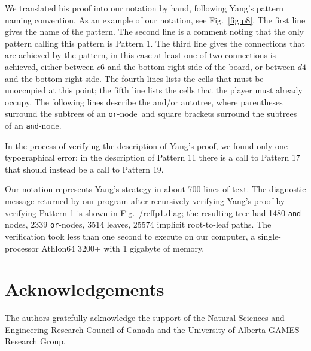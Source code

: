 \documentclass{llncs}
\def\aoat{and/or autotree}
\def\myAND{\mbox{\tt and}}
\def\myOR{\mbox{\tt or}}
\def\andnode{\myAND-node}
\def\ornode{\myOR-node}
\begin{document}


We translated his proof into our notation by hand,
following Yang's pattern naming convention.
As an example of our notation, see Fig.~\ref{fig:p8}.
The first line gives the name of the pattern.
The second line is a comment 
noting that the only pattern calling this pattern is Pattern 1.
The third line
gives the connections that are achieved by the pattern,
in this case at least one of two connections is achieved,
either between $c6$ and the bottom right side of the board,
or between $d4$ and the bottom right side.
The fourth lines lists the cells that must 
be unoccupied at this point;
the fifth line lists the cells that the player must
already occupy.
The following lines describe the \aoat,
where parentheses surround the subtrees of an \ornode\
and square brackets surround the subtrees of an \andnode.

In the process of verifying the description of Yang's proof,
we found only one typographical error:
in the description of Pattern 11 there is a call
to Pattern 17 that should instead be a call to Pattern 19.

Our notation represents Yang's strategy 
in about 700 lines of text.
The diagnostic message returned by our program
after recursively verifying Yang's proof
by verifying Pattern 1 is shown in Fig.~/ref{fp1.diag};
the resulting tree had 1480 \andnode s,
2339 \ornode s,
3514 leaves,
25574 implicit root-to-leaf paths.
The verification took less than one second to execute
on our computer,
a single-processor Athlon64 3200+ with 1 gigabyte of memory.



\section*{Acknowledgements}

The authors gratefully acknowledge the support of
  the Natural Sciences and Engineering Research Council of Canada
  and the University of Alberta GAMES Research Group.



\end{document}
